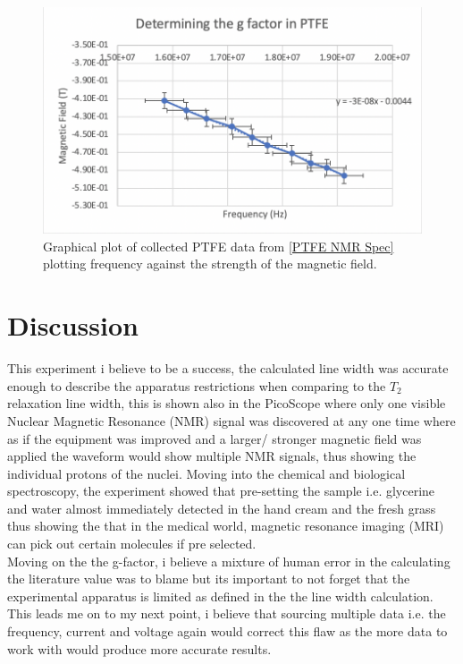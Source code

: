 \documentclass[12pt]{article}
\begin{document}
\begin{figure}[H]
\centering
\includegraphics[scale=0.8]{Images/Report/Part B1/Screenshot 2020-12-02 at 20.45.58.png}
\caption{Graphical plot of collected PTFE data from \cref{PTFE NMR Spec} plotting frequency against the strength of the magnetic field.}
\label{Part B1}
\end{figure}

\section{Discussion}
\label{Disscussion Section}

This experiment i believe to be a success, the calculated line width was accurate enough to describe the apparatus restrictions when comparing to the $T_2$ relaxation line width, this is shown also in the PicoScope where only one visible Nuclear Magnetic Resonance (NMR) signal was discovered at any one time where as if the equipment was improved and a larger/ stronger magnetic field was applied the waveform would show multiple NMR signals, thus showing the individual protons of the nuclei. Moving into the chemical and biological spectroscopy, the experiment showed that pre-setting the sample i.e. glycerine and water almost immediately detected in the hand cream and the fresh grass thus showing the that in the medical world, magnetic resonance imaging (MRI) can pick out certain molecules if pre selected. \\

Moving on the the g-factor, i believe a mixture of human error in the calculating the literature value was to blame but its important to not forget that the experimental apparatus is limited as defined in the the line width calculation. This leads me on to my next point, i believe that sourcing multiple data i.e. the frequency, current and voltage again would correct this flaw as the more data to work with would produce more accurate results. 
\end{document}

